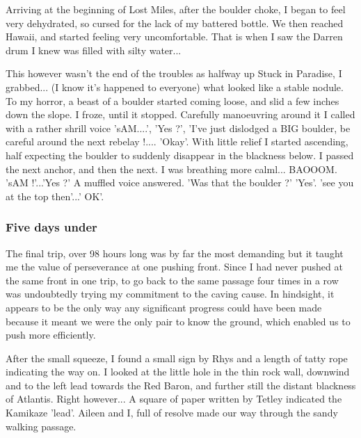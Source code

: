 \documentclass[onecolumn]{book}
\begin{document}
Arriving at the beginning of Lost Miles, after the boulder choke, I began to feel very dehydrated, so cursed for the lack of my battered bottle. We then reached Hawaii, and started feeling very uncomfortable. That is when I saw the Darren drum I knew was filled with silty water...

This however wasn't the end of the troubles as halfway up Stuck in Paradise, I grabbed... (I know it's happened to everyone) what looked like a stable nodule. To my horror, a beast of a boulder started coming loose, and slid a few inches down the slope. I froze, until it stopped. Carefully manoeuvring around it I called with a rather shrill voice 'sAM....', 'Yes ?', 'I've just dislodged a BIG boulder, be careful around the next rebelay !.... 'Okay'. With little relief I started ascending, half expecting the boulder to suddenly disappear in the blackness below. I passed the next anchor, and then the next. I was breathing more calml... BAOOOM.
'sAM !'...'Yes ?' A muffled voice answered. 'Was that the boulder ?' 'Yes'. 'see you at the top then'...' OK'.


\subsubsection{Five days under}
The final trip, over 98 hours long was by far the most demanding but it taught me the value of perseverance at one pushing front. Since I had never pushed at the same front in one trip, to go back to the same passage four times in a row was undoubtedly trying my commitment to the caving cause. In hindsight, it appears to be the only way any significant progress could have been made because it meant we were the only pair to know the ground, which enabled us to push more efficiently.

After the small squeeze, I found a small sign by Rhys and a length of tatty rope indicating the way on. I looked at the little hole in the thin rock wall, downwind and to the left lead towards the Red Baron, and further still the distant blackness of Atlantis. Right however... A square of paper written by Tetley indicated the Kamikaze 'lead'.  Aileen and I, full of resolve made our way through the sandy walking passage.
\end{document}
